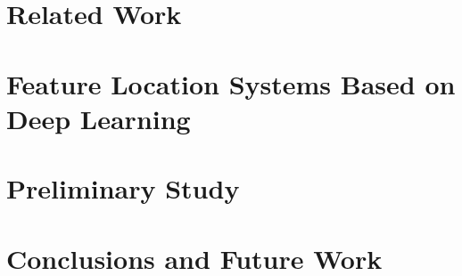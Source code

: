 \documentclass[conference]{IEEEtran}
\begin{document}
\section{Related Work}\label{related}


\section{Feature Location Systems Based on Deep Learning}\label{doc2vec}


\section{Preliminary Study}\label{study}


\section{Conclusions and Future Work}\label{conlusion}





\end{document}
